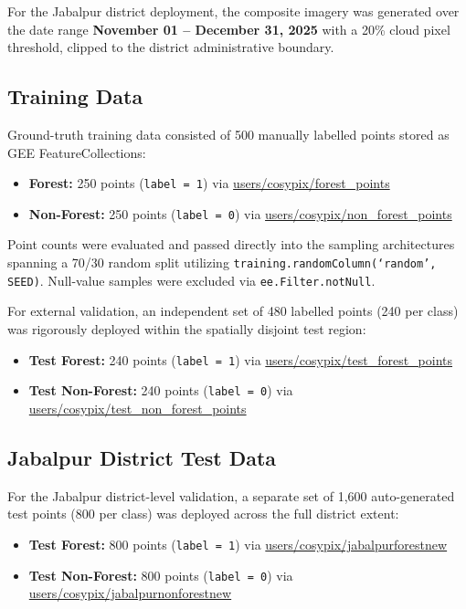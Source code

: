 \documentclass[12pt, a4paper, twocolumn]{article}
\begin{document}
For the Jabalpur district deployment, the composite imagery was generated over the date range \textbf{November 01 -- December 31, 2025} with a 20\% cloud pixel threshold, clipped to the district administrative boundary.

\subsection{Training Data}

Ground-truth training data consisted of 500 manually labelled points stored as GEE FeatureCollections:

\begin{itemize}
    \item \textbf{Forest:} 250 points (\texttt{label = 1}) via \url{users/cosypix/forest_points}
    \item \textbf{Non-Forest:} 250 points (\texttt{label = 0}) via \url{users/cosypix/non_forest_points}
\end{itemize}

Point counts were evaluated and passed directly into the sampling architectures spanning a 70/30 random split utilizing \texttt{training.randomColumn(`random', SEED)}. Null-value samples were excluded via \texttt{ee.Filter.notNull}.

For external validation, an independent set of 480 labelled points (240 per class) was rigorously deployed within the spatially disjoint test region:

\begin{itemize}
    \item \textbf{Test Forest:} 240 points (\texttt{label = 1}) via \url{users/cosypix/test_forest_points}
    \item \textbf{Test Non-Forest:} 240 points (\texttt{label = 0}) via \url{users/cosypix/test_non_forest_points}
\end{itemize}

\subsection{Jabalpur District Test Data}
\label{subsec:jbp_data}

For the Jabalpur district-level validation, a separate set of 1,600 auto-generated test points (800 per class) was deployed across the full district extent:

\begin{itemize}
    \item \textbf{Test Forest:} 800 points (\texttt{label = 1}) via \url{users/cosypix/jabalpurforestnew}
    \item \textbf{Test Non-Forest:} 800 points (\texttt{label = 0}) via \url{users/cosypix/jabalpurnonforestnew}
\end{itemize}
\end{document}
